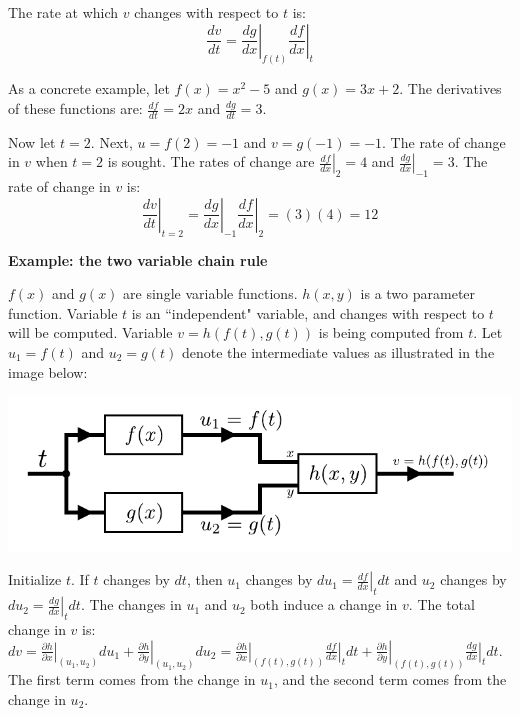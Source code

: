 \documentclass{article}
\begin{document}
The rate at which \(v\) changes with respect to \(t\) is:
\[\frac{dv}{dt} = \left.\frac{dg}{dx}\right|_{f(t)} \left.\frac{df}{dx}\right|_t\]

As a concrete example, let \(f(x) = x^2 - 5\) and \(g(x) = 3x + 2\). The derivatives of these functions are: \(\frac{df}{dt} = 2x\) and \(\frac{dg}{dt} = 3\). 

Now let \(t = 2\). Next, \(u = f(2) = -1\) and \(v = g(-1) = -1\). The rate of change in \(v\) when \(t = 2\) is sought. The rates of change are \(\left.\frac{df}{dx}\right|_2 = 4\) and \(\left.\frac{dg}{dx}\right|_{-1} = 3\). The rate of change in \(v\) is: 
\[\left.\frac{dv}{dt}\right|_{t = 2} = \left.\frac{dg}{dx}\right|_{-1} \left.\frac{df}{dx}\right|_2 = (3)(4) = 12\]   




\vspace{5mm}

\textbf{Example: the two variable chain rule}

\(f(x)\) and \(g(x)\) are single variable functions. \(h(x, y)\) is a two parameter function. Variable \(t\) is an ``independent" variable, and changes with respect to \(t\) will be computed. Variable \(v = h(f(t), g(t))\) is being computed from \(t\). Let \(u_1 = f(t)\) and \(u_2 = g(t)\) denote the intermediate values as illustrated in the image below:  

\begin{center}
\includegraphics[scale = 1.0]{two_variable_chain_rule}
\end{center}

Initialize \(t\). If \(t\) changes by \(dt\), then \(u_1\) changes by \(du_1 = \left.\frac{df}{dx}\right|_t dt\) and \(u_2\) changes by \(du_2 = \left.\frac{dg}{dx}\right|_t dt\). The changes in \(u_1\) and \(u_2\) both induce a change in \(v\). The total change in \(v\) is: \(dv = \left.\frac{\partial h}{\partial x}\right|_{(u_1, u_2)} du_1 + \left.\frac{\partial h}{\partial y}\right|_{(u_1, u_2)} du_2 = \left.\frac{\partial h}{\partial x}\right|_{(f(t),g(t))} \left.\frac{df}{dx}\right|_t dt + \left.\frac{\partial h}{\partial y}\right|_{(f(t),g(t))} \left.\frac{dg}{dx}\right|_t dt\). The first term comes from the change in \(u_1\), and the second term comes from the change in \(u_2\).  
\end{document}
